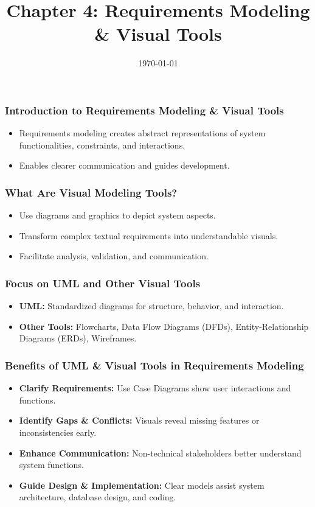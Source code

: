 \documentclass{beamer}
\title{Chapter 4: Requirements Modeling \& Visual Tools}
\author{}
\institute{}
\date{\today}
\begin{document}
\frame{\titlepage}

\begin{frame}[fragile]
    \frametitle{Introduction to Requirements Modeling \& Visual Tools}
    \begin{itemize}
        \item Requirements modeling creates abstract representations of system functionalities, constraints, and interactions.
        \item Enables clearer communication and guides development.
    \end{itemize}
\end{frame}

\begin{frame}[fragile]
    \frametitle{What Are Visual Modeling Tools?}
    \begin{itemize}
        \item Use diagrams and graphics to depict system aspects.
        \item Transform complex textual requirements into understandable visuals.
        \item Facilitate analysis, validation, and communication.
    \end{itemize}
\end{frame}

\begin{frame}[fragile]
    \frametitle{Focus on UML and Other Visual Tools}
    \begin{itemize}
        \item \textbf{UML:} Standardized diagrams for structure, behavior, and interaction.
        \item \textbf{Other Tools:} Flowcharts, Data Flow Diagrams (DFDs), Entity-Relationship Diagrams (ERDs), Wireframes.
    \end{itemize}
\end{frame}

\begin{frame}[fragile]
    \frametitle{Benefits of UML \& Visual Tools in Requirements Modeling}
    \begin{itemize}
        \item \textbf{Clarify Requirements:} Use Case Diagrams show user interactions and functions.
        \item \textbf{Identify Gaps \& Conflicts:} Visuals reveal missing features or inconsistencies early.
        \item \textbf{Enhance Communication:} Non-technical stakeholders better understand system functions.
        \item \textbf{Guide Design \& Implementation:} Clear models assist system architecture, database design, and coding.
    \end{itemize}
\end{frame}
\end{document}
